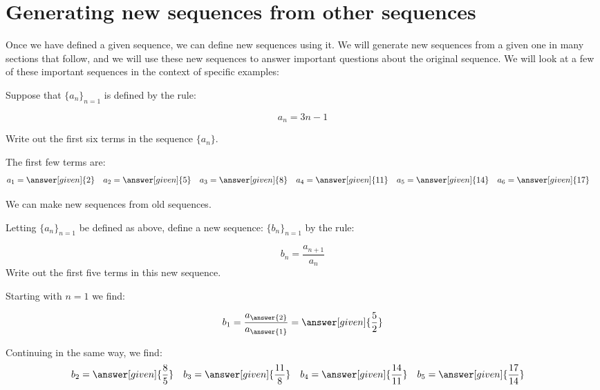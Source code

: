 \documentclass{ximera}
\begin{document}
\section{Generating new sequences from other sequences}


Once we have defined a given sequence, we can define new sequences using it.  We will generate new sequences from a given one in many sections that follow, and we will use these new sequences to answer important questions about the original sequence.  We will look at a few of these important sequences in the context of specific examples:
\begin{example}
Suppose that $\{a_n\}_{n=1}$ is defined by the rule:

\[
a_n = 3n-1
\]

Write out the first six terms in the sequence $\{a_n\}$.
\begin{explanation}
  The first few terms are:
    \begin{align*}
      a_1 &= \answer[given]{2} & 
      a_2 &= \answer[given]{5} & 
      a_3 &= \answer[given]{8} & 
      a_4 &= \answer[given]{11} & 
      a_5 &= \answer[given]{14}  & 
      a_6 &= \answer[given]{17} 
    \end{align*}
\end{explanation}
\end{example}

We can make new sequences from old sequences.

\begin{example}
Letting $\{a_n\}_{n=1}$ be defined as above, define a new sequence:
$\{b_n\}_{n=1}$ by the rule:

\[
b_n = \frac{a_{n+1}}{a_n} 
\]
Write out the first five terms in this new sequence.

\begin{explanation}
Starting with $n=1$ we find:

\[      b_1 = \frac{a_{\answer{2}}}{a_{\answer{1}}} = \answer[given]{\frac{5}{2}}       \]
      
Continuing in the same way, we find:     
     \begin{align*}
      	b_2 &=  \answer[given]{\frac{8}{5}}  & 
	b_3 &= \answer[given]{\frac{11}{8}}  & 
	b_4 &= \answer[given]{\frac{14}{11}}  & 
	b_5 &=  \answer[given]{\frac{17}{14}}  & 
    \end{align*}
    
\end{explanation}
    
\end{example}
\end{document}
